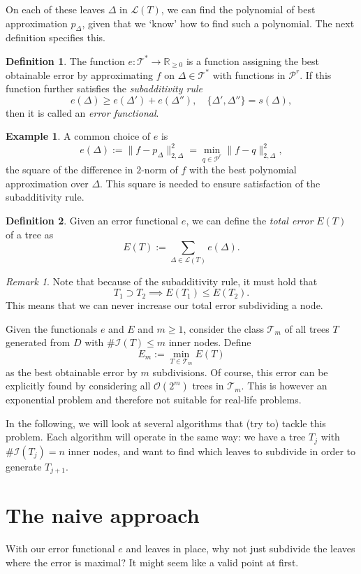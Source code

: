 \documentclass[11pt]{report}
\theoremstyle{definition}
\newtheorem{definition}{Definition}
\newtheorem*{example}{Example}
\theoremstyle{remark}
\newtheorem*{remark}{Remark}
\newcommand{\R}{\mathbb{R}}
\newcommand{\T}{\mathcal{T}}
\renewcommand{\L}{\mathcal{L}}
\renewcommand{\O}{\mathcal{O}}
\newcommand{\I}{\mathcal{I}}
\renewcommand{\P}{\mathcal{P}}
\newcommand{\node}{\Delta}
\begin{document}
On each of these leaves $\node$ in $\L(T)$, we can find the polynomial of best approximation $p_\node$, given that we `know' how to find such a polynomial. The next definition specifies this.

\begin{definition}
  \label{def:functional}
  The function $e: \T^* \to \R_{\geq 0}$ is a function assigning the best obtainable error by approximating $f$ on $\node \in \T^*$ with functions in $\P^r$. If this function further satisfies the \emph{subadditivity rule}
  \[
    e(\node) \geq e(\node') + e(\node''), \quad \{\node', \node''\} = s(\node),
  \]
  then it is called an \emph{error functional}.
\end{definition}
\begin{example}
  A common choice of $e$ is 
  \[
    e(\node) := \|f - p_\node\|^2_{2,\node} = \min_{q \in \P^r} \|f-q\|^2_{2,\node},
  \]
  the square of the difference in $2$-norm of $f$ with the best polynomial approximation over $\node$. This square is needed to ensure satisfaction of the subadditivity rule.
\end{example}

\begin{definition}
Given an error functional $e$, we can define the \emph{total error} $E(T)$ of a tree as
\[
  E(T) := \sum_{\node \in \L(T)} e(\node).
\]
\end{definition}
\begin{remark}
Note that because of the subadditivity rule, it must hold that
\[ T_1 \supset T_2 \implies E(T_1) \leq E(T_2). \]
This means that we can never increase our total error subdividing a node.
\end{remark}

Given the functionals $e$ and $E$ and $m \geq 1$, consider the class $\T_m$ of all trees $T$ generated from $D$ with $\#\I(T) \leq m$ inner nodes. Define
\[
  E_m := \min_{T \in \T_m} E(T)
\]
as the best obtainable error by $m$ subdivisions. Of course, this error can be explicitly found by considering all $\O(2^m)$ trees in $\T_m$. This is however an exponential problem and therefore not suitable for real-life problems.

In the following, we will look at several algorithms that (try to) tackle this problem. Each algorithm will operate in the same way: we have a tree $T_j$ with $\#\I(T_j) = n$ inner nodes, and want to find which leaves to subdivide in order to generate $T_{j+1}$.

\section{The naive approach}
With our error functional $e$ and leaves in place, why not just subdivide the leaves where the error is maximal? It might seem like a valid point at first.
\end{document}

